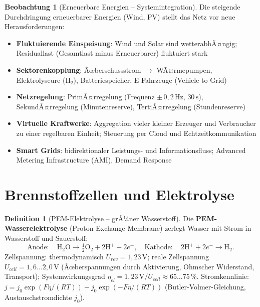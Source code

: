 ﻿\documentclass[a4paper,12pt]{report}
\theoremstyle{definition}
\newtheorem{definition}{Definition}
\newtheorem{beobachtung}{Beobachtung}
\begin{document}
\begin{beobachtung}[Erneuerbare Energien -- Systemintegration]
Die steigende Durchdringung erneuerbarer Energien (Wind, PV) stellt
das Netz vor neue Herausforderungen:
\begin{itemize}
    \item[-] \textbf{Fluktuierende Einspeisung}: Wind und Solar sind wetterabhÃ¤ngig;
          Residuallast (Gesamtlast minus Erneuerbarer) fluktuiert stark
    \item[-] \textbf{Sektorenkopplung}: Ãœberschussstrom $\to$ WÃ¤rmepumpen,
          Elektrolyseure (H$_2$), Batteriespeicher, E-Fahrzeuge (Vehicle-to-Grid)
    \item[-] \textbf{Netzregelung}: PrimÃ¤rregelung (Frequenz $\pm\,0{,}2\,\mathrm{Hz}$,
          $30\,\mathrm{s}$), SekundÃ¤rregelung (Minutenreserve), TertiÃ¤rregelung (Stundenreserve)
    \item[-] \textbf{Virtuelle Kraftwerke}: Aggregation vieler kleiner Erzeuger
          und Verbraucher zu einer regelbaren Einheit;
          Steuerung per Cloud und Echtzeitkommunikation
    \item[-] \textbf{Smart Grids}: bidirektionaler Leistungs- und Informationsfluss;
          Advanced Metering Infrastructure (AMI), Demand Response
\end{itemize}
\end{beobachtung}

\section{Brennstoffzellen und Elektrolyse}

\begin{definition}[PEM-Elektrolyse -- grÃ¼ner Wasserstoff]
Die \textbf{PEM-Wasserelektrolyse} (Proton Exchange Membrane) zerlegt
Wasser mit Strom in Wasserstoff und Sauerstoff:
\[
  \mathrm{Anode:}\quad \mathrm{H_2O} \to \tfrac{1}{2}\mathrm{O_2} + 2\mathrm{H^+} + 2e^-, \quad
  \mathrm{Kathode:}\quad 2\mathrm{H^+} + 2e^- \to \mathrm{H_2}.
\]
Zellspannung: thermodynamisch $U_{rev} = 1{,}23\,\mathrm{V}$;
reale Zellspannung $U_{cell} = 1{,}6\ldots2{,}0\,\mathrm{V}$
(Ãœberspannungen durch Aktivierung, Ohmscher Widerstand, Transport);
Systemwirkungsgrad $\eta_{el} = 1{,}23\,\mathrm{V}/U_{cell} \approx 65\ldots75\,\%$.
Stromkennlinie: $j = j_0\exp(F\eta/(RT)) - j_0\exp(-F\eta/(RT))$
(Butler-Volmer-Gleichung, Austauschstromdichte $j_0$).
\end{definition}
\end{document}
